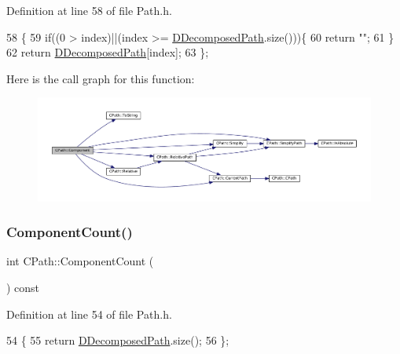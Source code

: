 Definition at line 58 of file Path.\+h.


\begin{DoxyCode}
58                                             \{
59             \textcolor{keywordflow}{if}((0 > index)||(index >= \hyperlink{classCPath_a03ed25209a01e633c107a0c877fc61f8}{DDecomposedPath}.size()))\{
60                 \textcolor{keywordflow}{return} \textcolor{stringliteral}{""};   
61             \}
62             \textcolor{keywordflow}{return} \hyperlink{classCPath_a03ed25209a01e633c107a0c877fc61f8}{DDecomposedPath}[index];  
63         \};
\end{DoxyCode}
Here is the call graph for this function\+:
\nopagebreak
\begin{figure}[H]
\begin{center}
\leavevmode
\includegraphics[width=350pt]{classCPath_a7396f770babe0fbea344afa76d31da7c_cgraph}
\end{center}
\end{figure}
\hypertarget{classCPath_ab399818c519c46871306f9851dd8141d}{}\label{classCPath_ab399818c519c46871306f9851dd8141d} 
\subsubsection{\texorpdfstring{Component\+Count()}{ComponentCount()}}
{\footnotesize\ttfamily int C\+Path\+::\+Component\+Count (\begin{DoxyParamCaption}{ }\end{DoxyParamCaption}) const\hspace{0.3cm}{\ttfamily [inline]}}



Definition at line 54 of file Path.\+h.


\begin{DoxyCode}
54                                   \{
55             \textcolor{keywordflow}{return} \hyperlink{classCPath_a03ed25209a01e633c107a0c877fc61f8}{DDecomposedPath}.size();
56         \};
\end{DoxyCode}
\hypertarget{classCPath_a24d8c455b1663ce251d3a749437fa4fe}{}\label{classCPath_a24d8c455b1663ce251d3a749437fa4fe} 
